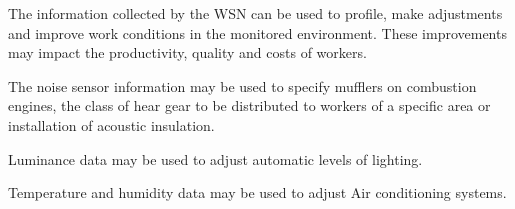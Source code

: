 \documentclass[conference]{IEEEtran}
\begin{document}
The information collected by the WSN can be used to profile, make adjustments and improve work conditions in the monitored environment. These improvements may impact the productivity, quality and costs of workers.

The noise sensor information may be used to specify mufflers on combustion engines, the class of hear gear to be distributed to workers of a specific area or installation of acoustic insulation.

Luminance data may be used to adjust automatic levels of lighting.

Temperature and humidity data may be used to adjust Air conditioning systems.






%
%



%
%
\end{document}
